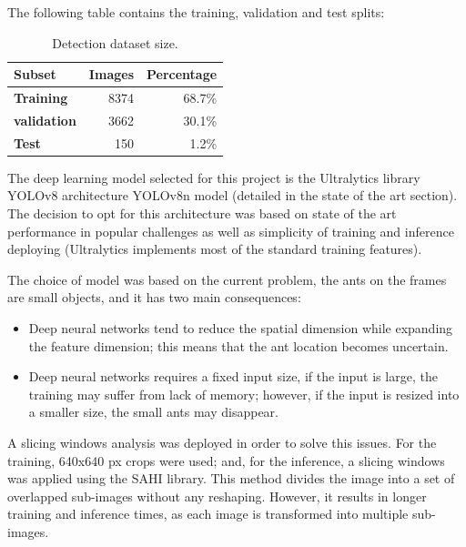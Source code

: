 {
    The following table contains the training, validation and test splits:
}

\begin{table}[H]
    \centering
    \caption[Detection dataset size]{ \footnotesize Detection dataset size.}
    \label{tab:detection splits}

    \begin{tabular}{p{3cm} rr}
        \toprule
        \textbf{Subset} & \textbf{Images} & \textbf{Percentage} \\
        \midrule
        \midrule
        \textbf{Training} & 8374 & 68.7\% \\
        \textbf{validation} & 3662 & 30.1\% \\
        \textbf{Test} & 150 & 1.2\% \\
        \bottomrule
    \end{tabular}
\end{table}

{
    The deep learning model selected for this project is the Ultralytics\cite{Jocher_YOLO_by_Ultralytics_2023} library \ac{YOLOv8} architecture \ac{YOLOv8n} model (detailed in the state of the art section).
    The decision to opt for this architecture was based on state of the art performance in popular challenges as well as simplicity of training and inference deploying (Ultralytics implements most of the standard training features).
}

{
    The choice of model was based on the current problem, the ants on the frames are small objects, and it has two main consequences: 
}

\begin{itemize}
    \item Deep neural networks tend to reduce the spatial dimension while expanding the feature dimension; this means that the ant location becomes uncertain.
    \item Deep neural networks requires a fixed input size, if the input is large, the training may suffer from lack of memory; however, if the input is resized into a smaller size, the small ants may disappear.
\end{itemize}

{
    A slicing windows analysis was deployed in order to solve this issues.
    For the training, 640x640 px crops were used; and, for the inference, a slicing windows was applied using the \ac{SAHI} library\cite{Akyon_Slicing_Aided_Hyper_2022,obss2021sahi}. 
    This method divides the image into a set of overlapped sub-images without any reshaping. 
    However, it results in longer training and inference times, as each image is transformed into multiple sub-images.
}

